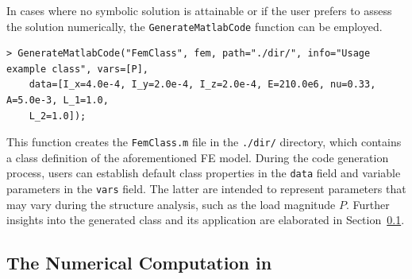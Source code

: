 In cases where no symbolic solution is attainable or if the user prefers to assess the solution numerically, the \texttt{GenerateMatlabCode} function can be employed.
%
\begin{verbatim}
> GenerateMatlabCode("FemClass", fem, path="./dir/", info="Usage example class", vars=[P],
    data=[I_x=4.0e-4, I_y=2.0e-4, I_z=2.0e-4, E=210.0e6, nu=0.33, A=5.0e-3, L_1=1.0,
    L_2=1.0]);
\end{verbatim}
%
This function creates the \texttt{FemClass.m} file in the \texttt{./dir/} directory, which contains a class definition of the aforementioned \ac{FE} model. During the code generation process, users can establish default class properties in the \texttt{data} field and variable parameters in the \texttt{vars} field. The latter are intended to represent parameters that may vary during the structure analysis, such as the load magnitude $P$. Further insights into the generated class and its application are elaborated in Section~\ref{app4:subsec:numerical_computation}.

\subsection{The Numerical Computation in \Matlab{}}
\label{app4:subsec:numerical_computation}

